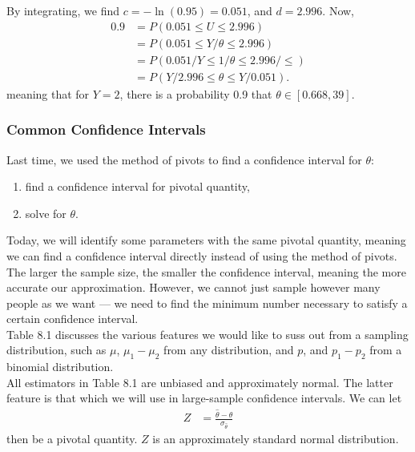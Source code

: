 \documentclass[10pt]{extarticle}
\begin{document}
\begin{description}
      By integrating, we find $c = -\ln(0.95) = 0.051$, and $d = 2.996$. Now,
      \begin{align*}
        0.9 &= P(0.051 \leq U \leq 2.996)\\
            &= P(0.051 \leq Y/\theta \leq 2.996)\\
            &= P(0.051/Y \leq 1/\theta \leq 2.996/\leq)\\
            &= P(Y/2.996 \leq \theta \leq Y/0.051).
      \end{align*}
      meaning that for $Y=2$, there is a probability 0.9 that $\theta\in [0.668,39]$.
  \end{description}
  \subsubsection{Common Confidence Intervals}%
  Last time, we used the method of pivots to find a confidence interval for $\theta$:
  \begin{enumerate}[(1)]
    \item find a confidence interval for pivotal quantity,
    \item solve for $\theta$.
  \end{enumerate}
  Today, we will identify some parameters with the same pivotal quantity, meaning we can find a confidence interval directly instead of using the method of pivots.\\

  The larger the sample size, the smaller the confidence interval, meaning the more accurate our approximation. However, we cannot just sample however many people as we want --- we need to find the minimum number necessary to satisfy a certain confidence interval.\\

  Table 8.1 discusses the various features we would like to suss out from a sampling distribution, such as $\mu$, $\mu_1 - \mu_2$ from any distribution, and $p$, and $p_1 - p_2$ from a binomial distribution.\\

  All estimators in Table 8.1 are unbiased and approximately normal. The latter feature is that which we will use in large-sample confidence intervals. We can let
  \begin{align*}
    Z &= \frac{\hat{\theta} - \theta}{\sigma_{\hat{\theta}}}
  \end{align*}
  then be a pivotal quantity. $Z$ is an approximately standard normal distribution.\\
\end{document}

